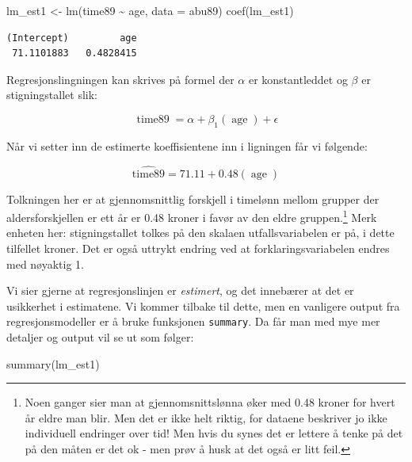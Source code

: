 \documentclass[
  norsk,
  letterpaper,
  DIV=11,
  numbers=noendperiod]{scrreprt}
\newenvironment{Shaded}{\begin{snugshade}}{\end{snugshade}}
\newcommand{\AttributeTok}[1]{\textcolor[rgb]{0.40,0.45,0.13}{#1}}
\newcommand{\FunctionTok}[1]{\textcolor[rgb]{0.28,0.35,0.67}{#1}}
\newcommand{\NormalTok}[1]{\textcolor[rgb]{0.00,0.23,0.31}{#1}}
\newcommand{\OtherTok}[1]{\textcolor[rgb]{0.00,0.23,0.31}{#1}}
\newcommand{\SpecialCharTok}[1]{\textcolor[rgb]{0.37,0.37,0.37}{#1}}
\theoremstyle{definition}
\theoremstyle{remark}
\begin{document}
\begin{Shaded}
\begin{Highlighting}[]
\NormalTok{lm\_est1 }\OtherTok{\textless{}{-}} \FunctionTok{lm}\NormalTok{(time89 }\SpecialCharTok{\textasciitilde{}}\NormalTok{ age, }\AttributeTok{data =}\NormalTok{ abu89)}
\FunctionTok{coef}\NormalTok{(lm\_est1)}
\end{Highlighting}
\end{Shaded}

\begin{verbatim}
(Intercept)         age 
 71.1101883   0.4828415 
\end{verbatim}

Regresjonslingningen kan skrives på formel der \(\alpha\) er
konstantleddet og \(\beta\) er stigningstallet slik:

\[
\operatorname{time89} = \alpha + \beta_{1}(\operatorname{age}) + \epsilon
\]

Når vi setter inn de estimerte koeffisientene inn i ligningen får vi
følgende:

\[
\operatorname{\widehat{time89}} = 71.11 + 0.48(\operatorname{age})
\]

Tolkningen her er at gjennomsnittlig forskjell i timelønn mellom grupper
der aldersforskjellen er ett år er 0.48 kroner i favør av den eldre
gruppen.\footnote{Noen ganger sier man at gjennomsnittslønna øker med
  0.48 kroner for hvert år eldre man blir. Men det er ikke helt riktig,
  for dataene beskriver jo ikke individuell endringer over tid! Men hvis
  du synes det er lettere å tenke på det på den måten er det ok - men
  prøv å husk at det også er litt feil.} Merk enheten her:
stigningstallet tolkes på den skalaen utfallsvariabelen er på, i dette
tilfellet kroner. Det er også uttrykt endring ved at
forklaringsvariabelen endres med nøyaktig 1.

Vi sier gjerne at regresjonslinjen er \emph{estimert}, og det innebærer
at det er usikkerhet i estimatene. Vi kommer tilbake til dette, men en
vanligere output fra regresjonsmodeller er å bruke funksjonen
\texttt{summary}. Da får man med mye mer detaljer og output vil se ut
som følger:

\begin{Shaded}
\begin{Highlighting}[]
\FunctionTok{summary}\NormalTok{(lm\_est1)}
\end{Highlighting}
\end{Shaded}
\end{document}
